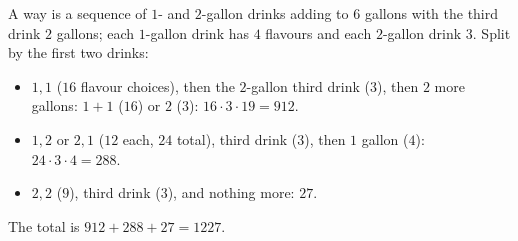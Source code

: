 A way is a sequence of $1$- and $2$-gallon drinks adding to $6$ gallons with the third drink $2$ gallons; each $1$-gallon drink has $4$ flavours and each $2$-gallon drink $3$. Split by the first two drinks:
\begin{itemize}
\item $1,1$ ($16$ flavour choices), then the $2$-gallon third drink ($3$), then $2$ more gallons: $1+1$ ($16$) or $2$ ($3$): $16\cdot3\cdot19=912$.
\item $1,2$ or $2,1$ ($12$ each, $24$ total), third drink ($3$), then $1$ gallon ($4$): $24\cdot3\cdot4=288$.
\item $2,2$ ($9$), third drink ($3$), and nothing more: $27$.
\end{itemize}
The total is $912+288+27=\boxed{1227}$.
